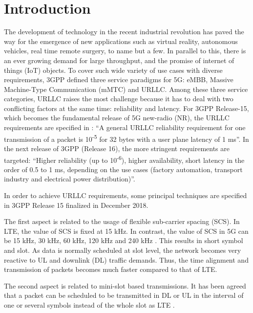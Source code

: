\documentclass{ieeeaccess}
\begin{document}
\titlepgskip=-15pt

\maketitle

\section{Introduction}
\label{I}
The development of technology in the recent industrial revolution has paved the way for the emergence of new applications such as virtual reality, autonomous vehicles, real time remote surgery, to name but a few. In parallel to this, there is an ever growing demand for large throughput, and the promise of internet of things (IoT) objects. To cover such wide variety of use cases with diverse requirements, 3GPP defined three service paradigms for 5G: eMBB, Massive Machine-Type Communication (mMTC) and URLLC. Among these three service categories, URLLC raises the most challenge because it has to deal with two conflicting factors at the same time: reliability and latency. For 3GPP Release-15, which becomes the fundamental release of 5G new-radio (NR), the URLLC requirements are specified in \cite{ref1}: ``A general URLLC reliability requirement for one transmission of a packet is 10\textsuperscript{-5} for 32 bytes with a user plane latency of 1 ms''. In the next release of 3GPP (Release 16), the more stringent requirements are targeted: ``Higher reliability (up to 10\textsuperscript{-6}), higher availability, short latency in the order of 0.5 to 1 ms, depending on the use cases (factory automation, transport industry and electrical power distribution)''\cite{ref2}.

In order to achieve URLLC requirements, some principal techniques are specified in 3GPP Release 15 finalized in December 2018.

The first aspect is related to the usage of flexible sub-carrier spacing (SCS). In LTE, the value of SCS is fixed at 15 kHz. In contrast, the value of SCS in 5G can be 15 kHz, 30 kHz, 60 kHz, 120 kHz and 240 kHz \cite{ref3}. This results in short symbol and slot. As data is normally scheduled at slot level, the network becomes very reactive to UL and downlink (DL) traffic demands. Thus, the time alignment and transmission of packets becomes much faster compared to that of LTE. 

The second aspect is related to mini-slot based transmissions. It has been agreed that a packet can be scheduled to be transmitted in DL or UL in the interval of one or several symbols instead of the whole slot as LTE \cite{ref4}.
\end{document}

